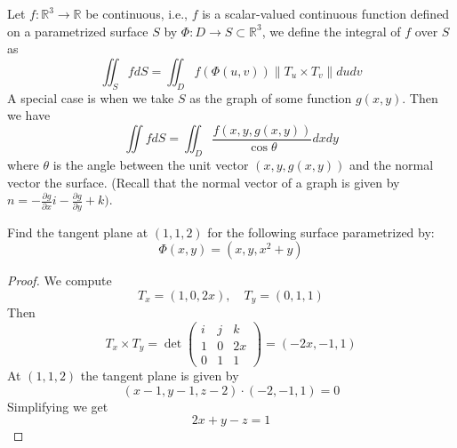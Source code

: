 \documentclass[openany]{book}
\newcommand{\R}{\mathbb{R}}
\begin{document}
\begin{defn}
    Let $f:\R^3\to\R$ be continuous, i.e., $f$ is a scalar-valued continuous function defined on a parametrized surface $S$ by $\Phi:D\to S\subset\R^3$, we define the integral of $f$ over $S$ as 
    \begin{equation*}
        \iint_SfdS=\iint_Df(\Phi(u,v))\|T_u\times T_v\|dudv
    \end{equation*}
    A special case is when we take $S$ as the graph of some function $g(x,y)$. Then we have 
    \begin{equation*}
        \iint fdS=\iint_D\frac{f(x,y,g(x,y))}{\cos\theta}dxdy
    \end{equation*}
    where $\theta$ is the angle between the unit vector $(x,y,g(x,y))$ and the normal vector the surface. (Recall that the normal vector of a graph is given by $n=-\frac{\partial g}{\partial x}i-\frac{\partial g}{\partial y}+k)$.
\end{defn}



\begin{prob}
    Find the tangent plane at $(1,1,2)$ for the following surface parametrized by:
    \begin{equation*}
        \Phi(x,y)=(x,y, x^2+y)
    \end{equation*}
\end{prob}
\begin{proof}
    We compute 
    \begin{equation*}
        T_x=(1, 0, 2x), \quad T_y=(0,1, 1)
    \end{equation*}
    Then 
    \begin{equation*}
        T_x\times T_y=\det\begin{pmatrix}
            i&j&k\\
            1&0&2x\\
            0&1&1
        \end{pmatrix}=(-2x, -1, 1)
    \end{equation*}
    At $(1,1,2)$ the tangent plane is given by 
    \begin{equation*}
        (x-1, y-1, z-2)\cdot (-2, -1, 1)=0
    \end{equation*}
    Simplifying we get 
    \begin{equation*}
        2x+y-z=1
    \end{equation*}
\end{proof}
\end{document}
